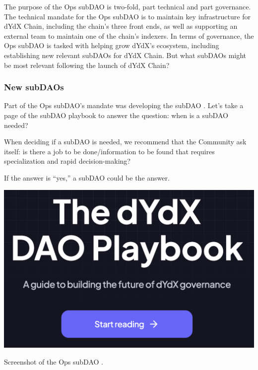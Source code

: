         The purpose of the Ops subDAO is two-fold, part technical and part governance. The technical mandate for the Ops subDAO is to maintain key infrastructure for dYdX Chain, including the chain's three front ends, as well as supporting an external team to maintain one of the chain's indexers. In terms of governance, the Ops subDAO is tasked with helping grow dYdX's ecosystem, including establishing new relevant subDAOs for dYdX Chain. But what subDAOs might be most relevant following the launch of dYdX Chain? 

        \subsubsection{New subDAOs}

            Part of the Ops subDAO's mandate was developing the subDAO . Let's take a page of the subDAO playbook to answer the question: when is a subDAO needed?
    
            \begin{displayquote}
                When deciding if a subDAO is needed, we recommend that the Community ask itself: is there a job to be done/information to be found that requires specialization and rapid decision-making? 
    
                If the answer is “yes,” a subDAO could be the answer.
            \end{displayquote}
    
            \begin{marginfigure}
                \centering
                \includegraphics[width=\linewidth]{figs/playbook.png}
                \caption{Screenshot of the Ops subDAO .}
                \label{fig:playbook}
            \end{marginfigure}
    
